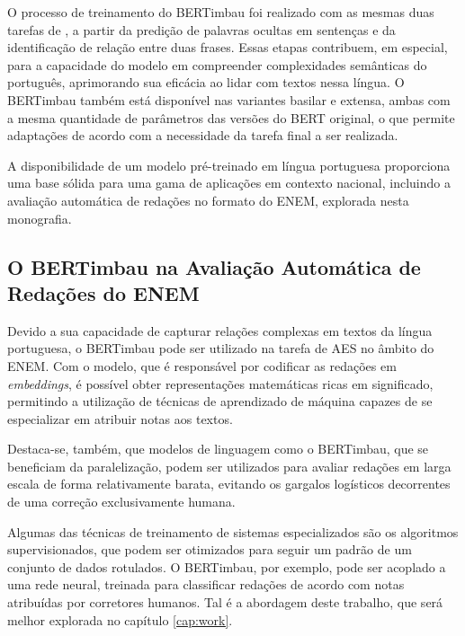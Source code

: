 O processo de treinamento do BERTimbau foi realizado com as mesmas duas tarefas de \citet{bert2018}, a partir da predição de palavras ocultas em sentenças e da identificação de relação entre duas frases. Essas etapas contribuem, em especial, para a capacidade do modelo em compreender complexidades semânticas do português, aprimorando sua eficácia ao lidar com textos nessa língua. O BERTimbau também está disponível nas variantes basilar e extensa, ambas com a mesma quantidade de parâmetros das versões do BERT original, o que permite adaptações de acordo com a necessidade da tarefa final a ser realizada.

A disponibilidade de um modelo pré-treinado em língua portuguesa proporciona uma base sólida para uma gama de aplicações em contexto nacional, incluindo a avaliação automática de redações no formato do ENEM, explorada nesta monografia.

\subsection{O BERTimbau na Avaliação Automática de Redações do ENEM}

Devido a sua capacidade de capturar relações complexas em textos da língua portuguesa, o BERTimbau pode ser utilizado na tarefa de AES no âmbito do ENEM. Com o modelo, que é responsável por codificar as redações em \textit{embeddings}, é possível obter representações matemáticas ricas em significado, permitindo a utilização de técnicas de aprendizado de máquina capazes de se especializar em atribuir notas aos textos.

Destaca-se, também, que modelos de linguagem como o BERTimbau, que se beneficiam da paralelização, podem ser utilizados para avaliar redações em larga escala de forma relativamente barata, evitando os gargalos logísticos decorrentes de uma correção exclusivamente humana.

Algumas das técnicas de treinamento de sistemas especializados são os algoritmos supervisionados, que podem ser otimizados para seguir um padrão de um conjunto de dados rotulados. O BERTimbau, por exemplo, pode ser acoplado a uma rede neural, treinada para classificar redações de acordo com notas atribuídas por corretores humanos. Tal é a abordagem deste trabalho, que será melhor explorada no capítulo \ref{cap:work}.
